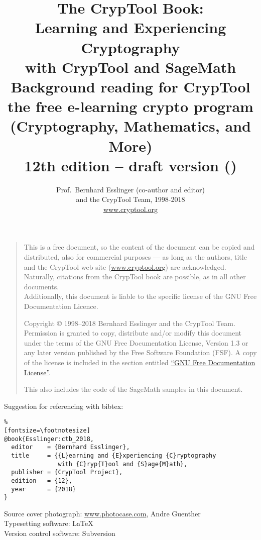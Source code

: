 \documentclass[a4paper,11pt,oneside,ngerman,english]{book}  %
\title{%
	{\Huge The CrypTool Book: \\[20pt]
         {\bf Learning and Experiencing\\[10pt] Cryptography\\[15pt]
          with CrypTool and SageMath}}\\[35pt]
	{\LARGE	Background reading for CrypTool\\
         the free e-learning crypto program \\[5pt]
	 (Cryptography, Mathematics, and More)} \\[35pt]
	 {\large 12th edition --  {\bf draft version} (\settimeformat{hhmmsstime}\currenttime)}
        \vspace{120pt}
}
\author{
        {\LARGE Prof.\ Bernhard Esslinger (co-author and editor)}\\[10pt]
        {\LARGE and the CrypTool Team, 1998-2018}\\[10pt]
        \url{www.cryptool.org}
}
\begin{document}


\pagestyle{plain}
\tikzset{ampersand replacement=\&}

\setlength{\fboxrule}{.5mm}
\setlength{\fboxsep}{1.75mm}
\setlength{\footnotesep}{6pt}
\addtolength{\footskip}{8pt}

\VerbatimFootnotes
\renewcommand\footnoterule{%
  \vspace{2em}
  \hrule width .4\columnwidth
 \vspace{4pt}
}


\frontmatter
\maketitle


\begin{quote}
This is a free document, so the content of the document can
be copied and distributed, also for commercial purposes --- as long as
the authors, title and the CrypTool web site (\url{www.cryptool.org})
are acknowledged. Naturally, citations from the CrypTool book are
possible, as in all other documents.\\
Additionally, this document is liable to the specific license of the
GNU Free Documentation Licence.

    Copyright \copyright{} 1998--2018 Bernhard Esslinger and the
    CrypTool Team. Permission is granted to copy,
    distribute and/or modify this document under the terms of the GNU
    Free Documentation License, Version 1.3 or any later version
    published by the Free Software Foundation (FSF). A copy of
    the license is included in the section entitled
    \hyperlink{appendix-GNU-fdl}{``GNU Free Documentation License''}.

    This also includes the code of the SageMath samples in this document.
\end{quote}


\vspace{70pt}\noindent Suggestion for referencing with bibtex:
\begin{Verbatim}%
[fontsize=\footnotesize]
@book{Esslinger:ctb_2018,
  editor    = {Bernhard Esslinger},
  title     = {{L}earning and {E}xperiencing {C}ryptography
               with {C}ryp{T}ool and {S}age{M}ath},
  publisher = {CrypTool Project},
  edition   = {12},
  year      = {2018}
}
\end{Verbatim}


\vspace{250pt}
\noindent
Source cover photograph: \url{www.photocase.com}, Andre Guenther\\
Typesetting software: \LaTeX\\
Version control software: Subversion
\end{document}
